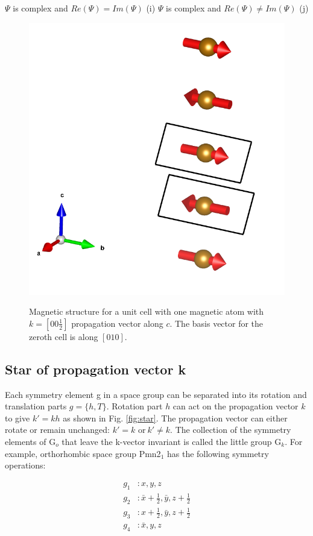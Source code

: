 \documentclass[10pt,doublespacing,edeposit]{uiucthesis2020}
\begin{document}
\begin{mainmatter}
$\Psi$  is complex and $Re(\Psi) = Im(\Psi)$ (i)
$\Psi$ is complex and $Re(\Psi) \neq Im(\Psi)$ (j)
\fi


\begin{figure}
\centering\includegraphics[width=0.5\columnwidth]{figures/ch4/propagation_vector_vesta.png} \\
\caption{\label{fig:propagation_vector}
Magnetic structure for a unit cell with one magnetic atom with $k = [00\frac{1}{2}]$ propagation vector along $c$. The basis vector for the zeroth cell is  along $[010]$.
}
\end{figure}


\subsection{Star of propagation vector k}


Each symmetry element g in a space group can be separated into its rotation and translation parts $g = \{h,T\}$. Rotation part $h$ can act on the propagation vector $k$ to give $k' = kh$ as shown in Fig. \ref{fig:star}. The propagation vector can either rotate or remain unchanged: $k' = k \text{ or}\ k' \neq k$. The collection of the symmetry elements of G$_o$ that leave the k-vector invariant is called the little group G$_k$. For example, orthorhombic space group Pmn2$_1$ has the following symmetry operations:

\begin{align*}
g_1 &: x,y,z\\
g_2 &: \bar{x}+\frac{1}{2},\bar{y}, z+\frac{1}{2}\\
g_3 &: x+\frac{1}{2},\bar{y}, z+\frac{1}{2}\\
g_4 &: \bar{x},y,z
\end{align*}


\end{mainmatter}
\end{document}
